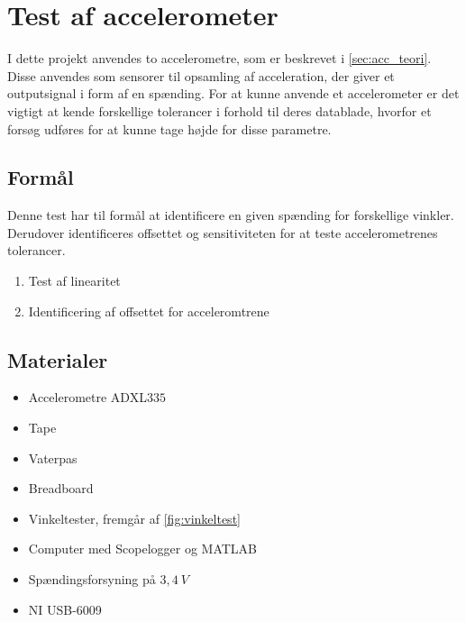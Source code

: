 \chapter{Test af accelerometer} 
\label{sec:test_acc}
I dette projekt anvendes to accelerometre, som er beskrevet i \autoref{sec:acc_teori}. Disse anvendes som sensorer til opsamling af acceleration, der giver et outputsignal i form af en spænding. For at kunne anvende et accelerometer er det vigtigt at kende forskellige tolerancer i forhold til deres datablade, hvorfor et forsøg udføres for at kunne tage højde for disse parametre.

\section{Formål}\label{sec:acc_formaal}
Denne test har til formål at identificere en given spænding for forskellige vinkler. Derudover identificeres %
offsettet og sensitiviteten for at teste accelerometrenes tolerancer.

\begin{enumerate}
\item Test af linearitet
\item Identificering af offsettet for acceleromtrene %
\end{enumerate}

\section{Materialer}
\begin{itemize}
\item Accelerometre ADXL$335$
\item Tape
\item Vaterpas
\item Breadboard
\item Vinkeltester, fremgår af \autoref{fig:vinkeltest}
\item Computer med Scopelogger og MATLAB
\item Spændingsforsyning på $3,4~V$ 
\item NI USB-6009
\end{itemize}

